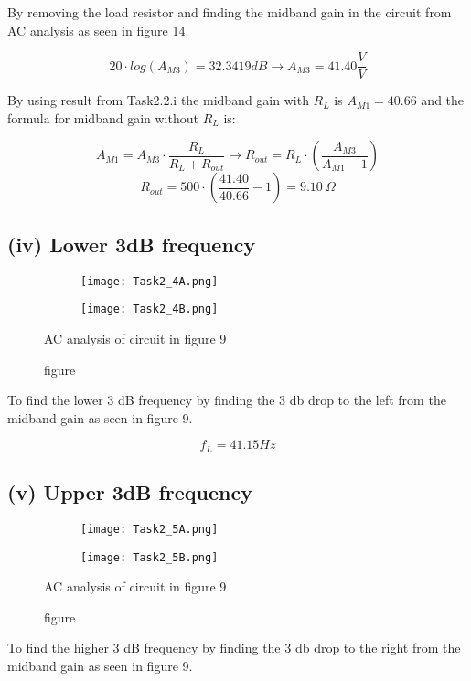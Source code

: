 	By removing the load resistor and finding the midband gain in the circuit from AC analysis as seen in figure 14.

	$$ 20 \cdot log(A_{M3}) = 32.3419 dB  \rightarrow A_{M3} = 41.40 \frac{V}{V}$$


	By using result from Task2.2.i the midband gain with $R_{L}$ is $A_{M1} = 40.66$ and the formula for midband gain without $R_{L}$ is:

	$$A_{M1} = A_{M3} \cdot \frac{R_{L}}{R_{L} + R_{out}} \rightarrow R_{out} = R_{L} \cdot (\frac{A_{M3}}{A_{M1} - 1})  $$
	$$R_{out} = 500 \cdot (\frac{41.40}{40.66}-1) = 9.10\ \Omega$$ 

	\pagebreak


	\subsection*{(iv) Lower 3dB frequency}

	\begin{figure}[h!]
	    \centering
	    \begin{subfigure}[h]{0.7\textwidth}
	            \texttt{[image: Task2\_4A.png]}
	            \label{fig:}
	    \end{subfigure}
	    \begin{subfigure}[h]{0.25\textwidth}
	            \texttt{[image: Task2\_4B.png]}
	            \label{fig:}
	    \end{subfigure}
	    \caption{figure}{AC analysis of circuit in figure 9}
	\end{figure}

	To find the lower 3 dB frequency by finding the 3 db drop to the left from the midband gain as seen in figure 9.

	$$f_{L} =  41.15 Hz$$




	
	\subsection*{(v) Upper 3dB frequency}

	\begin{figure}[h!]
	    \centering
	    \begin{subfigure}[h]{0.7\textwidth}
	            \texttt{[image: Task2\_5A.png]}
	            \label{fig:}
	    \end{subfigure}
	    \begin{subfigure}[h]{0.25\textwidth}
	            \texttt{[image: Task2\_5B.png]}
	            \label{fig:}
	    \end{subfigure}
	    \caption{figure}{AC analysis of circuit in figure 9}
	\end{figure}
	To find the higher 3 dB frequency by finding the 3 db drop to the right from the midband gain as seen in figure 9.

